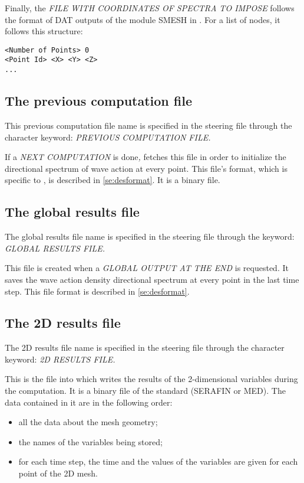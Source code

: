 Finally, the \textit{FILE WITH COORDINATES OF SPECTRA TO IMPOSE} follows the format of DAT outputs of the
module {\scshape SMESH} in \salome{}. For a list of nodes, it follows this structure:

\lstset{language=TelemacCas,
        basicstyle=\scriptsize\ttfamily}
\begin{lstlisting}[frame=trBL]
<Number of Points> 0
<Point Id> <X> <Y> <Z>
...
\end{lstlisting}

\subsection{ The previous computation file}

 This previous computation file name is specified in the steering file through the character keyword: \textit{PREVIOUS COMPUTATION FILE.}

 If a \textit{NEXT COMPUTATION} is done\textit{, }\tomawac fetches this file in order to initialize the directional spectrum of wave action at every point. This file's format, which is specific to \tomawac, is described in \ref{se:desformat}. It is a binary file.

\subsection{ The global results file}

 The global results file name is specified in the steering file through the keyword: \textit{GLOBAL RESULTS FILE.}

 This file is created when a \textit{GLOBAL OUTPUT AT THE END} is requested. It saves the wave action density directional spectrum at every point in the last time step. This file format is described in \ref{se:desformat}.


\subsection{ The 2D results file }

 The 2D results file name is specified in the steering file through the character keyword: \textit{2D RESULTS FILE.}

 This is the file into which \tomawac writes the results of the 2-dimensional variables during the computation. It is a binary file of the \telemac standard (SERAFIN or MED). The data contained in it are in the following order:

\begin{itemize}
\item  all the data about the mesh geometry;
\item  the names of the variables being stored;
\item  for each time step, the time and the values of the variables are given for each point of the 2D mesh.
\end{itemize}

